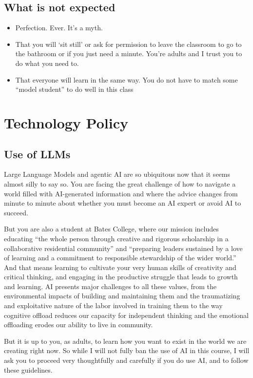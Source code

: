\documentclass[
  letterpaper,
  DIV=11,
  numbers=noendperiod]{scrartcl}
\providecommand{\tightlist}{%
  \setlength{\itemsep}{0pt}\setlength{\parskip}{0pt}}
\begin{document}
\subsection{What is not expected}

\begin{itemize}
\tightlist
\item
  Perfection. Ever. It's a myth.
\item
  That you will `sit still' or ask for permission to leave the classroom
  to go to the bathroom or if you just need a minute. You're adults and
  I trust you to do what you need to.
\item
  That everyone will learn in the same way. You do not have to match
  some ``model student'' to do well in this class
\end{itemize}

\section{Technology Policy}\label{techpolicy}

\subsection{Use of LLMs}\label{llms}

Large Language Models and agentic AI are so ubiquitous now that it seems
almost silly to say so. You are facing the great challenge of how to
navigate a world filled with AI-generated information and where the
advice changes from minute to minute about whether you must become an AI
expert or avoid AI to succeed.

But you are also a student at Bates College, where our mission includes
educating ``the whole person through creative and rigorous scholarship
in a collaborative residential community'' and ``preparing leaders
sustained by a love of learning and a commitment to responsible
stewardship of the wider world.'' And that means learning to cultivate
your very human skills of creativity and critical thinking, and engaging
in the productive struggle that leads to growth and learning. AI
presents major challenges to all these values, from the environmental
impacts of building and maintaining them and the traumatizing and
exploitative nature of the labor involved in training them to the way
cognitive offload reduces our capacity for independent thinking and the
emotional offloading erodes our ability to live in community.

But it is up to you, as adults, to learn how you want to exist in the
world we are creating right now. So while I will not fully ban the use
of AI in this course, I will ask you to proceed very thoughtfully and
carefully if you do use AI, and to follow these guidelines.
\end{document}
